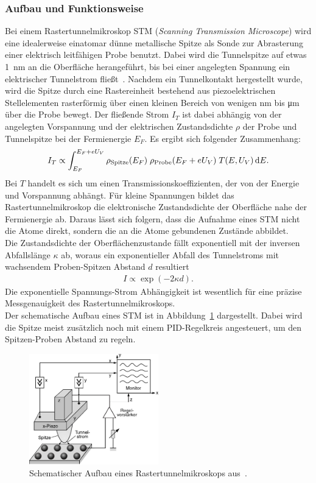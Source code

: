 \documentclass[a4paper,twoside,final]{article}
\begin{document}
\subsubsection{Aufbau und Funktionsweise}\label{sec:STM_Aufbau}
Bei einem Rastertunnelmikroskop STM (\textit{Scanning Transmission Microscope}) wird eine idealerweise einatomar dünne metallische Spitze als Sonde zur Abrasterung einer elektrisch leitfähigen Probe benutzt. Dabei wird die Tunnelspitze auf etwas \SI{1}{\nano\metre} an die Oberfläche herangeführt, bis bei einer angelegten Spannung ein elektrischer Tunnelstrom fließt~\cite{Versuchsanleitung}. Nachdem ein Tunnelkontakt hergestellt wurde, wird die Spitze durch eine Rastereinheit bestehend aus piezoelektrischen Stellelementen rasterförmig über einen kleinen Bereich von wenigen \si{\nano\metre} bis \si{\micro\metre} über die Probe bewegt. Der fließende Strom $I_T$ ist dabei abhängig von der angelegten Vorspannung und der elektrischen Zustandsdichte $\rho$ der Probe und Tunnelspitze bei der Fermienergie $E_F$. Es ergibt sich folgender Zusammenhang:
\begin{align}
  I_T \propto \int_{E_F}^{E_F+ eU_V} \rho_\text{Spitze}(E_F)\;\rho_\text{Probe}(E_F+eU_V) \;T(E,U_V)\,\mathrm{d} E.\label{eqn:Tunnelstrom}
\end{align}
Bei $T$ handelt es sich um einen Transmissionskoeffizienten, der von der Energie und Vorspannung abhängt. Für kleine Spannungen bildet das Rastertunnelmikroskop die elektronische Zustandsdichte der Oberfläche nahe der Fermienergie ab. Daraus lässt sich folgern, dass die Aufnahme eines STM nicht die Atome direkt, sondern die an die Atome gebundenen Zustände abbildet.\\
Die Zustandsdichte der Oberflächenzustande fällt exponentiell mit der inversen Abfallslänge $\kappa$ ab, woraus ein exponentieller Abfall des Tunnelstroms mit wachsendem Proben-Spitzen Abstand $d$ resultiert
\begin{align}
  I \propto \exp(-2\kappa d).
\end{align}
Die exponentielle Spannungs-Strom Abhängigkeit ist wesentlich für eine präzise Messgenauigkeit des Rastertunnelmikroskops.\\
Der schematische Aufbau eines STM ist in Abbildung~\ref{fig:Rastertunnelmikroskop} dargestellt. Dabei wird die Spitze meist zusätzlich noch mit einem PID-Regelkreis angesteuert, um den Spitzen-Proben Abstand zu regeln.
\begin{figure}[htp]
    \centering
    \includegraphics[width=0.5\textwidth]{Bilder/Raster_Tunnelmikroskop.pdf}
    \caption{Schematischer Aufbau eines Rastertunnelmikroskops aus~\cite{Demtroeder}.}
    \label{fig:Rastertunnelmikroskop}
\end{figure}
\newpage
\end{document}
